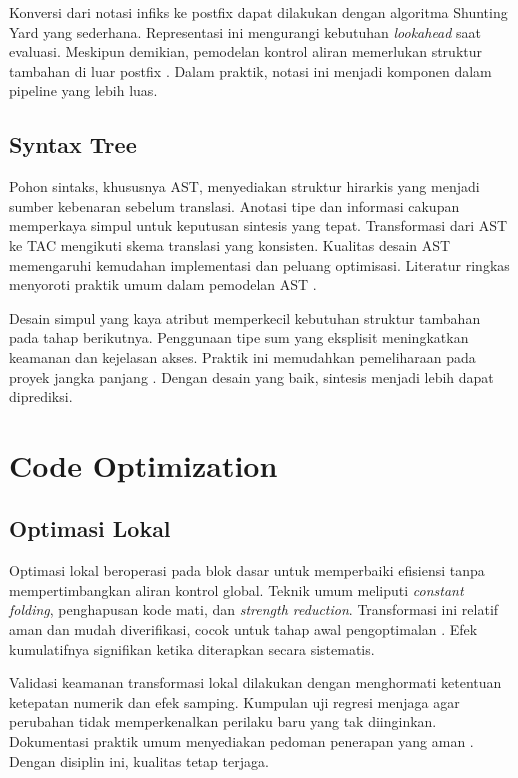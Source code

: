 \documentclass[../main.tex]{subfiles}
\begin{document}
Konversi dari notasi infiks ke postfix dapat dilakukan dengan algoritma Shunting Yard yang sederhana. Representasi ini mengurangi kebutuhan \emph{lookahead} saat evaluasi. Meskipun demikian, pemodelan kontrol aliran memerlukan struktur tambahan di luar postfix \citep{WikiPostfix}. Dalam praktik, notasi ini menjadi komponen dalam pipeline yang lebih luas.

\subsection{Syntax Tree}
Pohon sintaks, khususnya AST, menyediakan struktur hirarkis yang menjadi sumber kebenaran sebelum translasi. Anotasi tipe dan informasi cakupan memperkaya simpul untuk keputusan sintesis yang tepat. Transformasi dari AST ke TAC mengikuti skema translasi yang konsisten. Kualitas desain AST memengaruhi kemudahan implementasi dan peluang optimisasi. Literatur ringkas menyoroti praktik umum dalam pemodelan AST \citep{WikiAST}.

Desain simpul yang kaya atribut memperkecil kebutuhan struktur tambahan pada tahap berikutnya. Penggunaan tipe sum yang eksplisit meningkatkan keamanan dan kejelasan akses. Praktik ini memudahkan pemeliharaan pada proyek jangka panjang \citep{WikiAST}. Dengan desain yang baik, sintesis menjadi lebih dapat diprediksi.

\section{Code Optimization}
\subsection{Optimasi Lokal}
Optimasi lokal beroperasi pada blok dasar untuk memperbaiki efisiensi tanpa mempertimbangkan aliran kontrol global. Teknik umum meliputi \emph{constant folding}, penghapusan kode mati, dan \emph{strength reduction}. Transformasi ini relatif aman dan mudah diverifikasi, cocok untuk tahap awal pengoptimalan \citep{WikiConstantFolding,WikiDCE,WikiStrengthReduction}. Efek kumulatifnya signifikan ketika diterapkan secara sistematis.

Validasi keamanan transformasi lokal dilakukan dengan menghormati ketentuan ketepatan numerik dan efek samping. Kumpulan uji regresi menjaga agar perubahan tidak memperkenalkan perilaku baru yang tak diinginkan. Dokumentasi praktik umum menyediakan pedoman penerapan yang aman \citep{WikiOptimization}. Dengan disiplin ini, kualitas tetap terjaga.
\end{document}
